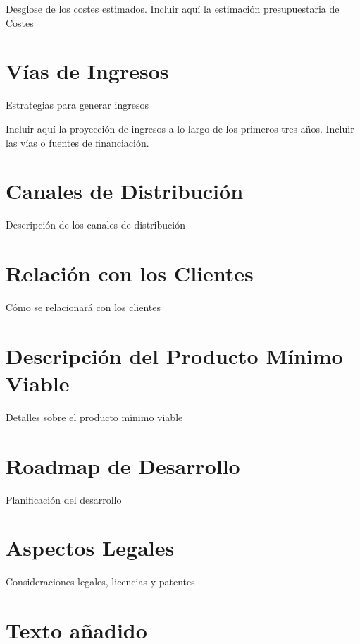 Desglose de los costes estimados. Incluir aquí la estimación presupuestaria de Costes

\section{Vías de Ingresos}
Estrategias para generar ingresos

Incluir aquí la proyección de ingresos a lo largo de los primeros tres años. Incluir las vías o fuentes de financiación.

\section{Canales de Distribución}

Descripción de los canales de distribución

\section{Relación con los Clientes}

Cómo se relacionará con los clientes

\section{Descripción del Producto Mínimo Viable}

Detalles sobre el producto mínimo viable

\section{Roadmap de Desarrollo}

Planificación del desarrollo

\section{Aspectos Legales}

Consideraciones legales, licencias y patentes

\section{Texto añadido}

\lipsum[1-15]